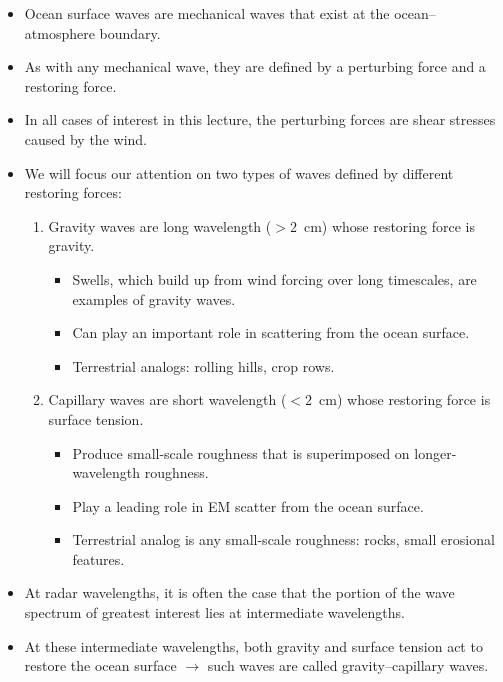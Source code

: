 \documentclass[11pt, oneside]{article}
\begin{document}
\begin{itemize}
	\item Ocean surface waves are mechanical waves that exist at the ocean--atmosphere boundary.
	\item As with any mechanical wave, they are defined by a perturbing force and a restoring force.
	\item In all cases of interest in this lecture, the perturbing forces are shear stresses caused by the wind.
	\item We will focus our attention on two types of waves defined by different restoring forces:
	\begin{enumerate}
		\item Gravity waves are long wavelength ($>2$~cm) whose restoring force is gravity.
		\begin{itemize}
			\item Swells, which build up from wind forcing over long timescales, are examples of gravity waves.
			\item Can play an important role in scattering from the ocean surface.
			\item Terrestrial analogs: rolling hills, crop rows.
		\end{itemize}
		\item Capillary waves are short wavelength ($<2$~cm) whose restoring force is surface tension.
		\begin{itemize}
			\item Produce small-scale roughness that is superimposed on longer-wavelength roughness.
			\item Play a leading role in EM scatter from the ocean surface.
			\item Terrestrial analog is any small-scale roughness: rocks, small erosional features.
		\end{itemize}
	\end{enumerate}
	\item At radar wavelengths, it is often the case that the portion of the wave spectrum of greatest interest lies at intermediate wavelengths.
	\item At these intermediate wavelengths, both gravity and surface tension act to restore the ocean surface $\rightarrow$ such waves are called gravity--capillary waves.
\end{itemize}
\end{document}
